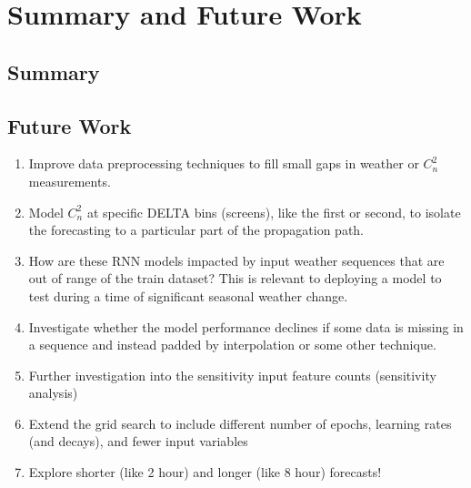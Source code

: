 \chapter{Summary and Future Work}
\label{ch6}

\section{Summary}

\section{Future Work}
\begin{enumerate}
	\item Improve data preprocessing techniques to fill small gaps in weather or $C_{n}^{2}$ measurements.
	\item Model $C_{n}^{2}$ at specific DELTA bins (screens), like the first or second, to isolate the forecasting to a particular part of the propagation path.
	\item How are these \ac{RNN} models impacted by input weather sequences that are out of range of the train dataset? This is relevant to deploying a model to test during a time of significant seasonal weather change.
	\item Investigate whether the model performance declines if some data is missing in a sequence and instead padded by interpolation or some other technique.
	\item Further investigation into the sensitivity input feature counts (sensitivity analysis)
	\item Extend the grid search to include different number of epochs, learning rates (and decays), and fewer input variables
	\item Explore shorter (like 2 hour) and longer (like 8 hour) forecasts!
\end{enumerate}